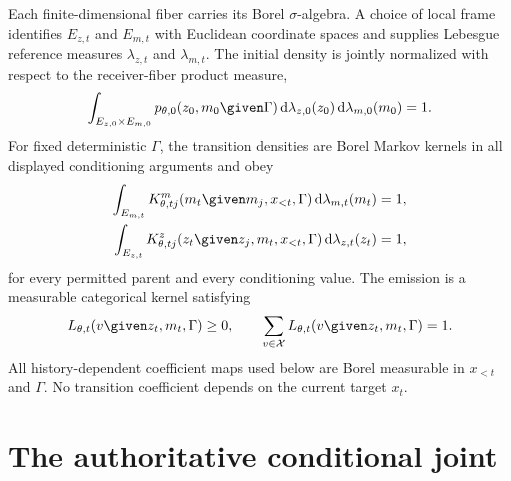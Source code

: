Each finite-dimensional fiber carries its Borel $\sigma$-algebra.  A choice of local frame identifies $E_{z,t}$ and $E_{m,t}$ with Euclidean coordinate spaces and supplies Lebesgue reference measures $\lambda_{z,t}$ and $\lambda_{m,t}$.  The initial density is jointly normalized with respect to the receiver-fiber product measure,
\begin{equation}
\int_{E_{z,0}\times E_{m,0}}
p_{\theta,0}(z_0,m_0\given\Gamma)
\mathop{\mathrm d\lambda_{z,0}(z_0)}
\mathop{\mathrm d\lambda_{m,0}(m_0)}
=1.
\label{eq:normalized-initial-law}
\end{equation}
For fixed deterministic $\Gamma$, the transition densities are Borel Markov kernels in all displayed conditioning arguments and obey
\begin{equation}
\begin{aligned}
\int_{E_{m,t}}K^m_{\theta,tj}
(m_t\given m_j,x_{<t},\Gamma)
\mathop{\mathrm d\lambda_{m,t}(m_t)}&=1,\\
\int_{E_{z,t}}K^z_{\theta,tj}
(z_t\given z_j,m_t,x_{<t},\Gamma)
\mathop{\mathrm d\lambda_{z,t}(z_t)}&=1,
\end{aligned}
\label{eq:normalized-transition-kernels}
\end{equation}
for every permitted parent and every conditioning value.  The emission is a measurable categorical kernel satisfying
\begin{equation}
L_{\theta,t}(v\given z_t,m_t,\Gamma)\geq0,
\qquad
\sum_{v\in\mathcal X}L_{\theta,t}(v\given z_t,m_t,\Gamma)=1.
\label{eq:normalized-emission-kernel}
\end{equation}
All history-dependent coefficient maps used below are Borel measurable in $x_{<t}$ and $\Gamma$.  No transition coefficient depends on the current target $x_t$.

\section{The authoritative conditional joint}

